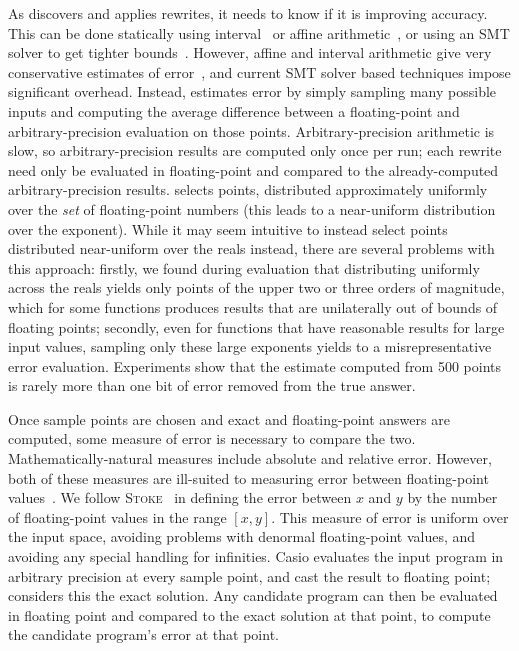 \documentclass[paper.tex]{subfiles}
\begin{document}
As \casio discovers and applies rewrites,
  it needs to know if it is improving accuracy.
This can be done statically using interval~\cite{} or affine arithmetic~\cite{},
  or using an SMT solver to get tighter bounds~\cite{}.
However, affine and interval arithmetic give
  very conservative estimates of error~\cite{},
  and current SMT solver based techniques impose significant overhead.
Instead, \casio estimates error by simply sampling many possible inputs
  and computing the average difference between a floating-point
  and arbitrary-precision evaluation on those points.
Arbitrary-precision arithmetic is slow,
  so arbitrary-precision results are computed only once per run;
  each rewrite need only be evaluated in floating-point
  and compared to the already-computed arbitrary-precision results.
\casio selects \nSample points, distributed approximately uniformly
  over the \emph{set} of floating-point numbers
  (this leads to a near-uniform distribution over the exponent).
While it may seem intuitive to instead select points
  distributed near-uniform over the reals instead,
  there are several problems with this approach:
firstly, we found during evaluation
  that distributing uniformly across the reals
  yields only points of the upper two or three orders of magnitude,
  which for some functions produces results
  that are unilaterally out of bounds of floating points;
secondly, even for functions that have reasonable results for large input values,
  sampling only these large exponents yields to a misrepresentative error evaluation.
Experiments show that the estimate computed from 500 points
  is rarely more than one bit of error removed from the true answer.

  Once sample points are chosen and exact and floating-point answers
  are computed, some measure of error is necessary to compare the two.
  Mathematically-natural measures include absolute and relative error.
  However, both of these measures are ill-suited to measuring error
  between floating-point values~\cite{}.  We follow
  \textsc{Stoke}~\cite{} in defining the error between $x$ and $y$ by
  the number of floating-point values in the range $[x, y]$.  This
  measure of error is uniform over the input space, avoiding problems
  with denormal floating-point values, and avoiding any special
  handling for infinities.  Casio evaluates the input program in
  arbitrary precision at every sample point, and cast the result to
  floating point; \casio considers this the exact solution.  Any
  candidate program can then be evaluated in floating point and
  compared to the exact solution at that point, to compute the
  candidate program's error at that point.
\end{document}
